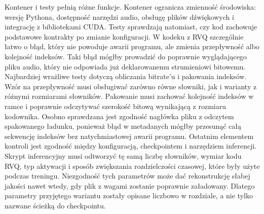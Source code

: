 Kontener i testy pełnią różne funkcje. Kontener ogranicza zmienność środowiska: wersję Pythona, dostępność narzędzi audio, obsługę plików dźwiękowych i integrację z bibliotekami CUDA. Testy sprawdzają natomiast, czy kod zachowuje podstawowe kontrakty po zmianie konfiguracji. W kodeku z RVQ szczególnie łatwo o błąd, który nie powoduje awarii programu, ale zmienia przepływność albo kolejność indeksów. Taki błąd mógłby prowadzić do poprawnie wyglądającego pliku audio, który nie odpowiada już deklarowanemu strumieniowi bitowemu. Najbardziej wrażliwe testy dotyczą obliczania bitrate'u i pakowania indeksów. Wzór na przepływność musi obsługiwać zarówno równe słowniki, jak i warianty z różnymi rozmiarami słowników. Pakowanie musi zachować kolejność indeksów w ramce i poprawnie odczytywać szerokość bitową wynikającą z rozmiaru kodownika. Osobno sprawdzana jest zgodność nagłówka pliku z odczytem spakowanego ładunku, ponieważ błąd w metadanych mógłby przesunąć całą sekwencję indeksów bez natychmiastowej awarii programu. Ostatnim elementem kontroli jest zgodność między konfiguracją, checkpointem i narzędziem inferencji. Skrypt inferencyjny musi odtworzyć tę samą liczbę słowników, wymiar kodu RVQ, typ aktywacji i sposób zwiększania rozdzielczości czasowej, które były użyte podczas treningu. Niezgodność tych parametrów może dać rekonstrukcję słabej jakości nawet wtedy, gdy plik z wagami zostanie poprawnie załadowany. Dlatego parametry przyjętego wariantu zostały opisane liczbowo w rozdziale, a nie tylko nazwane ścieżką do checkpointu.
